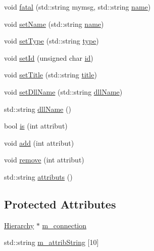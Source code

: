 \begin{DoxyCompactItemize}
void \hyperlink{classObject_ae62acd3d09f716220f75f252dc38bc9a}{fatal} (std\+::string mymsg, std\+::string \hyperlink{classObject_a300f4c05dd468c7bb8b3c968868443c1}{name})
\item 
void \hyperlink{classObject_ae30fea75683c2d149b6b6d17c09ecd0c}{set\+Name} (std\+::string \hyperlink{classObject_a300f4c05dd468c7bb8b3c968868443c1}{name})
\item 
void \hyperlink{classObject_aae534cc9d982bcb9b99fd505f2e103a5}{set\+Type} (std\+::string \hyperlink{classObject_a84f99f70f144a83e1582d1d0f84e4e62}{type})
\item 
void \hyperlink{classObject_a398fe08cba594a0ce6891d59fe4f159f}{set\+Id} (unsigned char \hyperlink{classObject_af99145335cc61ff6e2798ea17db009d2}{id})
\item 
void \hyperlink{classObject_a89557dbbad5bcaa02652f5d7fa35d20f}{set\+Title} (std\+::string \hyperlink{classObject_a73a0f1a41828fdd8303dd662446fb6c3}{title})
\item 
void \hyperlink{classObject_a870c5af919958c2136623b2d7816d123}{set\+Dll\+Name} (std\+::string \hyperlink{classObject_a2e3947f2870094c332d7454117f3ec63}{dll\+Name})
\item 
std\+::string \hyperlink{classObject_a2e3947f2870094c332d7454117f3ec63}{dll\+Name} ()
\item 
bool \hyperlink{classAttrib_a704f26af560909ad22065083bb7d4c34}{is} (int attribut)
\item 
void \hyperlink{classAttrib_a235f773af19c900264a190b00a3b4ad7}{add} (int attribut)
\item 
void \hyperlink{classAttrib_a7d4ef7e32d93cb287792b87b857e79f3}{remove} (int attribut)
\item 
std\+::string \hyperlink{classAttrib_aee7bbf16b144887f196e1341b24f8a26}{attributs} ()
\end{DoxyCompactItemize}
\subsection*{Protected Attributes}
\begin{DoxyCompactItemize}
\item 
\hyperlink{classHierarchy}{Hierarchy} $\ast$ \hyperlink{classElement_abe3de7a5dbbc9a6dd2d7e012e5fdb266}{m\+\_\+connection}
\item 
std\+::string \hyperlink{classAttrib_a3414521d7a82476e874b25a5407b5e63}{m\+\_\+attrib\+String} \mbox{[}10\mbox{]}
\end{DoxyCompactItemize}
